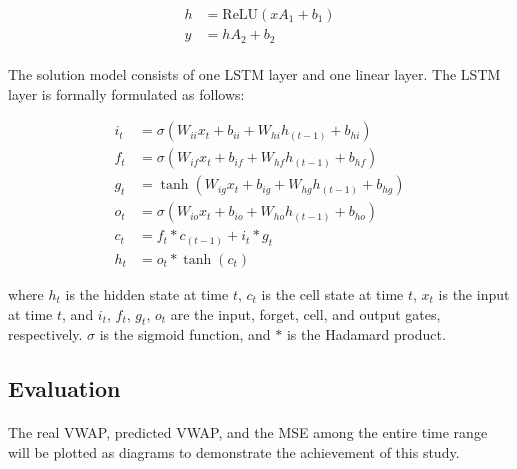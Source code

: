 \documentclass[12pt, letterpaper]{article}
\begin{document}
\begin{align*}
    h & =\mathrm{ReLU}(xA_1+b_1) \\
    y & =hA_2+b_2
\end{align*}


\paragraph{}
The solution model consists of one LSTM layer and one linear layer. The LSTM layer is formally formulated as follows:

\begin{align*}
    i_t & =\sigma(W_{ii}x_t+b_{ii}+W_{hi}h_{(t-1)}+b_{hi}) \\
    f_t & =\sigma(W_{if}x_t+b_{if}+W_{hf}h_{(t-1)}+b_{hf}) \\
    g_t & =\tanh(W_{ig}x_t+b_{ig}+W_{hg}h_{(t-1)}+b_{hg}) \\
    o_t & =\sigma(W_{io}x_t+b_{io}+W_{ho}h_{(t-1)}+b_{ho}) \\
    c_t & =f_t*c_{(t-1)}+i_t*g_t \\
    h_t & =o_t*\tanh(c_t)
\end{align*}

where \(h_t\) is the hidden state at time \(t\), \(c_t\) is the cell state at time \(t\), \(x_t\) is the input at time \(t\), and \(i_t\), \(f_t\), \(g_t\), \(o_t\) are the input, forget, cell, and output gates, respectively. \(\sigma\) is the sigmoid function, and \(*\) is the Hadamard product.

\subsection{Evaluation}

\paragraph{}
The real VWAP, predicted VWAP, and the MSE among the entire time range will be plotted as diagrams to demonstrate the achievement of this study.
\end{document}
